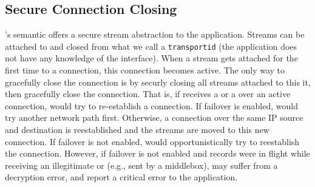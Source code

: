 

\subsection{Secure Connection Closing}
\tcpls's semantic offers a secure stream abstraction to the application.
Streams can be attached to and closed from what we call a \texttt{transportid}
(the application does not have any knowledge of the \tcp interface). When a
stream gets attached for the first time to a \tcp connection, this connection
becomes active. The only way to gracefully
close the \tcp connection is by securly closing all
streams attached to this it, then \tcpls gracefully close the \tcp
connection. That is, if \tcpls receives a \rst or a \fin over an active \tcp
connection, \tcpls would try to re-establish
a \tcp connection. If failover is enabled, \tcpls would try another
network path first. Otherwise, a connection over the same
IP source and destination is
reestablished and the streams are moved to this new \tcp
connection. If failover is not enabled, \tcpls would opportunistically try to
reestablish the connection. However, if failover is not enabled and
records were in flight while receiving an illegitimate \rst or \fin
(e.g., sent by a middlebox), \tcpls may suffer from a decryption error, and report a critical
error to the application.




